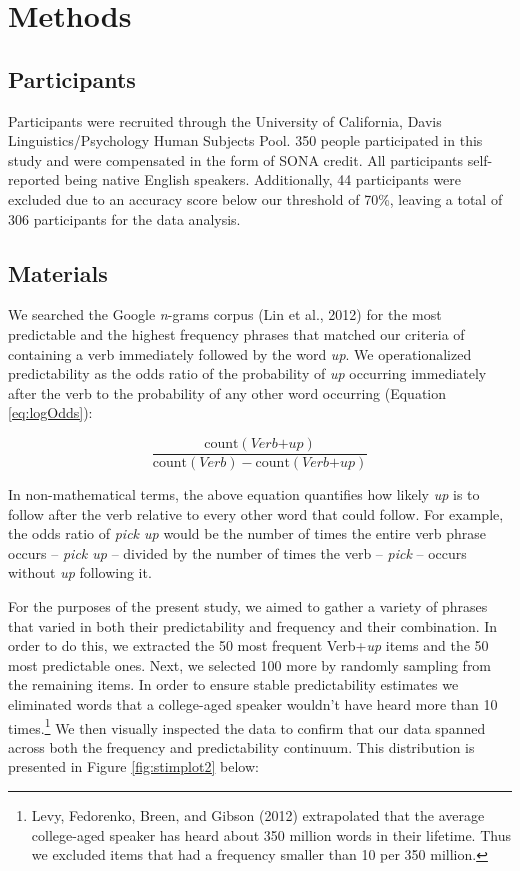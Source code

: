 \documentclass[
  man,floatsintext]{apa6}
\begin{document}
\section{Methods}\label{methods}

\subsection{Participants}\label{participants}

Participants were recruited through the University of California, Davis Linguistics/Psychology Human Subjects Pool. 350 people participated in this study and were compensated in the form of SONA credit. All participants self-reported being native English speakers. Additionally, 44 participants were excluded due to an accuracy score below our threshold of 70\%, leaving a total of 306 participants for the data analysis.

\subsection{Materials}\label{materials}

We searched the Google \emph{n}-grams corpus (Lin et al., 2012) for the most predictable and the highest frequency phrases that matched our criteria of containing a verb immediately followed by the word \emph{up}. We operationalized predictability as the odds ratio of the probability of \emph{up} occurring immediately after the verb to the probability of any other word occurring (Equation \eqref{eq:logOdds}):

\begin{equation}
\label{eq:logOdds}
\frac{\mathrm{count(\textit{Verb+up})}}{\mathrm{count(\textit{Verb})} - \mathrm{count(\textit{Verb+up})}} 
\end{equation}

In non-mathematical terms, the above equation quantifies how likely \emph{up} is to follow after the verb relative to every other word that could follow. For example, the odds ratio of \emph{pick up} would be the number of times the entire verb phrase occurs -- \emph{pick up} -- divided by the number of times the verb -- \emph{pick} -- occurs without \emph{up} following it.

For the purposes of the present study, we aimed to gather a variety of phrases that varied in both their predictability and frequency and their combination. In order to do this, we extracted the 50 most frequent Verb+\emph{up} items and the 50 most predictable ones. Next, we selected 100 more by randomly sampling from the remaining items. In order to ensure stable predictability estimates we eliminated words that a college-aged speaker wouldn't have heard more than 10 times.\footnote{Levy, Fedorenko, Breen, and Gibson (2012) extrapolated that the average college-aged speaker has heard about 350 million words in their lifetime. Thus we excluded items that had a frequency smaller than 10 per 350 million.} We then visually inspected the data to confirm that our data spanned across both the frequency and predictability continuum. This distribution is presented in Figure \ref{fig:stimplot2} below:
\end{document}

